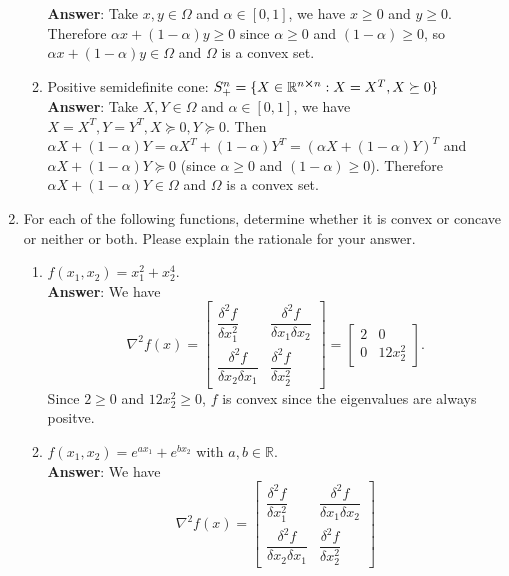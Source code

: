 \documentclass{article}
\begin{document}
\begin{enumerate}
\begin{enumerate}
                        \textbf{Answer}: Take $x,y\in\Omega$ and $\alpha\in[0,1]$, we have $x\geq 0$ and $y\geq 0$. Therefore $\alpha x+(1-\alpha)y\geq 0$ since $\alpha\geq 0$ and $(1-\alpha)\geq 0$, so $\alpha x+(1-\alpha)y\in\Omega$ and $\Omega$ is a convex set.
                  \item Positive semidefinite cone: $S_+^n=\{X\in\mathbb{R}^{n\cross n}:X=X^T,X\succeq 0\}$\\
                        \textbf{Answer}: Take $X,Y\in\Omega$ and $\alpha\in[0,1]$, we have $X=X^T,Y=Y^T,X\succeq 0,Y\succeq 0$. Then $\alpha X+(1-\alpha)Y=\alpha X^T+(1-\alpha)Y^T=(\alpha X+(1-\alpha)Y)^T$ and $\alpha X+(1-\alpha)Y\succeq 0$ (since $\alpha\geq 0$ and $(1-\alpha)\geq 0$). Therefore $\alpha X+(1-\alpha)Y\in\Omega$ and $\Omega$ is a convex set.
            \end{enumerate}
      \item For each of the following functions, determine whether it is convex or concave or neither or both. Please explain the rationale for your answer.
            \begin{enumerate}
                  \item $f(x_1,x_2)=x_1^2+x_2^4$.\\
                        \textbf{Answer}: We have \[
                              \nabla^2 f(x)=\begin{bmatrix}
                                    \dfrac{\delta^2 f}{\delta x_1^2} & \dfrac{\delta^2 f}{\delta x_1\delta x_2} \\\dfrac{\delta^2 f}{\delta x_2\delta x_1}&\dfrac{\delta^2 f}{\delta x_2^2}
                              \end{bmatrix}=\begin{bmatrix}
                                    2 & 0       \\
                                    0 & 12x_2^2
                              \end{bmatrix}.
                        \] Since $2\geq 0$ and $12x_2^2\geq 0$, $f$ is convex since the eigenvalues are always positve.
                  \item $f(x_1,x_2)=e^{ax_1}+e^{bx_2}$ with $a,b\in\mathbb{R}$.\\
                        \textbf{Answer}: We have \[
                              \nabla^2 f(x)=\begin{bmatrix}
                                    \dfrac{\delta^2 f}{\delta x_1^2} & \dfrac{\delta^2 f}{\delta x_1\delta x_2} \\\dfrac{\delta^2 f}{\delta x_2\delta x_1}&\dfrac{\delta^2 f}{\delta x_2^2}

\end{bmatrix}\]
\end{enumerate}
\end{enumerate}
\end{document}

